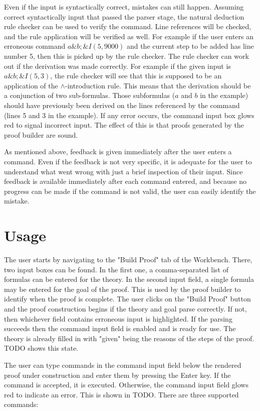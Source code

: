 \documentclass[11pt,twoside,a4paper]{report}
\begin{document}
Even if the input is syntactically correct, mistakes can still happen. Assuming correct syntactically input that passed the parser stage, the natural deduction rule checker can be used to verify the command. Line references will be checked, and the rule application will be verified as well. For example if the user enters an erroneous command $a\&b; \&I(5, 9000)$ and the current step to be added has line number 5, then this is picked up by the rule checker. The rule checker can work out if the derivation was made correctly. For example if the given input is $a\&b; \&I(5,3)$, the rule checker will see that this is supposed to be an application of the $\wedge$-introduction rule. This means that the derivation should be a conjunction of two sub-formulas. Those subformulas ($a$ and $b$ in the example) should have previously been derived on the lines referenced by the command (lines 5 and 3 in the example). If any error occurs, the command input box glows red to signal incorrect input. The effect of this is that proofs generated by the proof builder are sound.

As mentioned above, feedback is given immediately after the user enters a command. Even if the feedback is not very specific, it is adequate for the user to understand what went wrong with just a brief inspection of their input. Since feedback is available immediately after each command entered, and because no progress can be made if the command is not valid, the user can easily identify the mistake.

\section{Usage}
The user starts by navigating to the "Build Proof" tab of the Workbench. There, two input boxes can be found. In the first one, a comma-separated list of formulas can be entered for the theory. In the second input field, a single formula may be entered for the goal of the proof. This is used by the proof builder to identify when the proof is complete. The user clicks on the "Build Proof" button and the proof construction begins if the theory and goal parse correctly. If not, then whichever field contains erroneous input is highlighted. If the parsing succeeds then the command input field is enabled and is ready for use. The theory is already filled in with "given" being the reasons of the steps of the proof. TODO shows this state.

The user can type commands in the command input field below the rendered proof under construction and enter them by pressing the Enter key. If the command is accepted, it is executed. Otherwise, the command input field glows red to indicate an error. This is shown in TODO. There are three supported commands:
\end{document}
